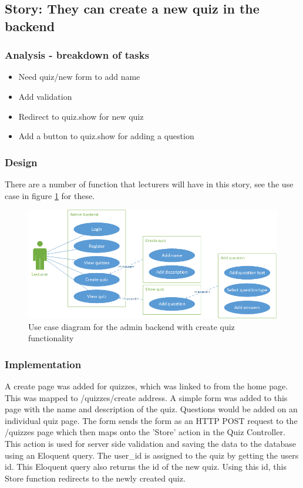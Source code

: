 \subsection{Story: They can create a new quiz in the backend}
\subsubsection{Analysis - breakdown of tasks}
\begin{itemize}
	\item Need quiz/new form to add name
	\item Add validation
	\item Redirect to quiz.show for new quiz
	\item Add a button to quiz.show for adding a question
\end{itemize}
\subsubsection{Design}
There are a number of function that lecturers will have in this story, see the use case in figure \ref{fig:quiz-create-use-case} for these.
\begin{figure}[H]
	\caption{Use case diagram for the admin backend with create quiz functionality}
	\centerline{\includegraphics[scale=0.9]{Chapter2/Iter-2/iter-2-use-case-create}}
	\label{fig:quiz-create-use-case}
\end{figure}
\subsubsection{Implementation}
A create page was added for quizzes, which was linked to from the home page. This was mapped to /quizzes/create address. A simple form was added to this page with the name and description of the quiz. Questions would be added on an individual quiz page. The form sends the form as an HTTP POST request to the /quizzes page which then maps onto the 'Store' action in the Quiz Controller. This action is used for server side validation and saving the data to the database using an Eloquent query. The user\_id is assigned to the quiz by getting the users id. This Eloquent query also returns the id of the new quiz. Using this id, this Store function redirects to the newly created quiz.

